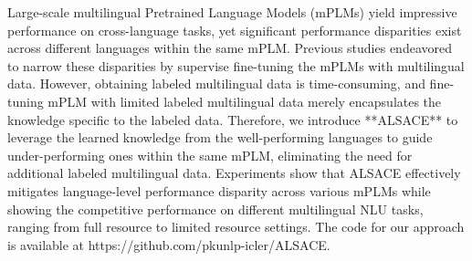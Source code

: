 Large-scale multilingual Pretrained Language Models (mPLMs) yield impressive performance on cross-language tasks, yet significant performance disparities exist across different languages within the same mPLM.  Previous studies endeavored to narrow these disparities by supervise fine-tuning the mPLMs with multilingual data. However, obtaining labeled multilingual data is time-consuming, and fine-tuning mPLM with limited labeled multilingual data merely encapsulates the knowledge specific to the labeled data. Therefore, we introduce **ALSACE** to leverage the learned knowledge from the well-performing languages to guide under-performing ones within the same mPLM, eliminating the need for additional labeled multilingual data.  Experiments show that ALSACE effectively mitigates language-level performance disparity across various mPLMs while showing the competitive performance on different multilingual NLU tasks, ranging from full resource to limited resource settings.  The code for our approach is available at https://github.com/pkunlp-icler/ALSACE.